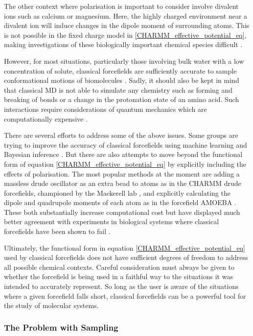 The other context where polarisation is important to consider involve divalent ions such as calcium or magnesium. Here, the highly charged environment near a divalent ion will induce changes in the dipole moment of surrounding atoms. This is not possible in the fixed charge model in \ref{CHARMM_effective_potential_eq}, making investigations of these biologically important chemical species difficult \cite{mamatkulov2013}\cite{bergonzo2016}.

However, for most situations, particularly those involving bulk water with a low concentration of solute, classical forcefields are sufficiently accurate to sample conformational motions of biomolecules \cite{hollingsworth2018}. Sadly, it should also be kept in mind that classical MD is not able to simulate any chemistry such as forming and breaking of bonds or a change in the protonation state of an amino acid. Such interactions require considerations of quantum mechanics which are computationally expensive \cite{melo2018}.

There are several efforts to address some of the above issues. Some groups are trying to improve the accuracy of classical forcefields using machine learning and Bayesian inference \cite{nerenberg2018}. But there are also attempts to move beyond the functional form of equation \ref{CHARMM_effective_potential_eq} by explicitly including the effects of polarisation. The most popular methods at the moment are adding a massless drude oscillator as an extra bead to atoms as in the CHARMM drude forcefields, championed by the Mackerell lab \cite{lin2020}, and explicitly calculating the dipole and quadrupole moments of each atom as in the forcefield AMOEBA \cite{shi2013a}. These both substantially increase computational cost but have displayed much better agreement with experiments in biological systems where classical forcefields have been shown to fail \cite{ngo2021}\cite{li2017}\cite{shi2013}. 

Ultimately, the functional form in equation \ref{CHARMM_effective_potential_eq} used by classical forcefields does not have sufficient degrees of freedom to address all possible chemical contexts. Careful consideration must always be given to whether the forcefield is being used in a faithful way to the situations it was intended to accurately represent. So long as the user is aware of the situations where a given forcefield falls short, classical forcefields can be a powerful tool for the study of molecular systems.

\subsubsection{The Problem with Sampling}
\label{sampling_problem}

